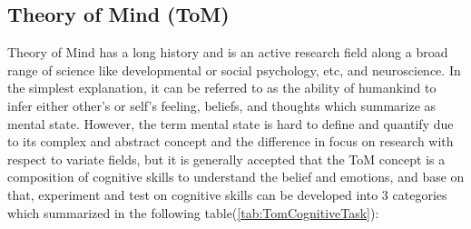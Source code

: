 \documentclass[12pt]{article}
\begin{document}
\newpage
\subsection{Theory of Mind (ToM)}
Theory of Mind has a long history and is an active research field along a broad range of science like developmental or social  psychology, etc, and neuroscience. In the simplest explanation, it can be referred to as the ability of humankind to infer either other's or self's feeling, beliefs, and thoughts which summarize as mental state\cite{Byom_2013}. However, the term mental state is hard to define and quantify due to its complex and abstract concept and the difference in focus on research with respect to variate fields, but it is generally accepted that the ToM concept is a composition of cognitive skills to understand the belief and emotions\cite{Beaudoin_2020}, and base on that, experiment and test on cognitive skills can be developed into 3 categories which summarized in the following table(\ref{tab:TomCognitiveTask})\cite{Beaudoin_2020,Byom_2013}: 
\end{document}
